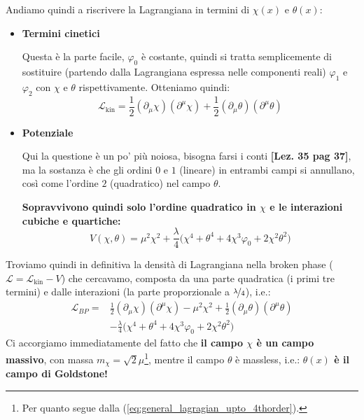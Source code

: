 \documentclass[../main.tex]{subfiles}
\begin{document}
Andiamo quindi a riscrivere la Lagrangiana in termini di $\chi(x)$ e $\theta(x)$:
\begin{itemize}
    \item[\blacksquare] \textbf{Termini cinetici} 

    Questa è la parte facile, $\varphi_0$ è costante, quindi si tratta semplicemente di sostituire (partendo dalla Lagrangiana espressa nelle componenti reali) $\varphi_1$ e $\varphi_2$ con  $\chi$ e $\theta$ rispettivamente. Otteniamo quindi:
    \begin{equation}
        \mathscr{L}_\text{kin} = \frac{1}{2}(\partial_\mu\chi)(\partial^\mu\chi)+\frac{1}{2}(\partial_\mu\theta)(\partial^\mu\theta)
        \label{eq:kinetic_terms_U1_SSB}
    \end{equation}
    \item[\blacksquare] \textbf{Potenziale}

    Qui la questione è un po' più noiosa, bisogna farsi i conti \textbf{[Lez. 35 pag 37]}, ma la sostanza è che gli ordini $0$ e $1$ (lineare) in entrambi campi si annullano, così come l'ordine $2$ (quadratico) nel campo $\theta$. 

    \textbf{Sopravvivono quindi solo l'ordine quadratico in $\chi$ e le interazioni cubiche e quartiche:}
    \begin{equation}
        V(\chi, \theta) = \mu^2\chi^2 + \frac{\lambda}{4}\big(\chi^4 + \theta^4 + 4\chi^3\varphi_0 +2\chi^2\theta^2 \big)
        \label{eq:potential_terms_U1_SSB}
    \end{equation}
\end{itemize}
Troviamo quindi in definitiva la densità di Lagrangiana nella broken phase ($\mathscr{L} = \mathscr{L}_\text{kin} - V$) che cercavamo, composta da una parte quadratica (i primi tre termini) e dalle interazioni (la parte proporzionale a $\nicefrac{\lambda}{4}$), i.e.:
\begin{equation}
    \boxed{\begin{aligned}
        \mathscr{L}_{BP} =& \frac{1}{2}(\partial_\mu\chi)(\partial^\mu\chi) -\mu^2\chi^2 +\frac{1}{2}(\partial_\mu\theta)(\partial^\mu\theta) \\
        &-\frac{\lambda}{4}\big(\chi^4 + \theta^4 + 4\chi^3\varphi_0 +2\chi^2\theta^2 \big)
    \end{aligned}}
    \label{eq:brokenphase_lagrangian_U1_SSB}
\end{equation}
Ci accorgiamo immediatamente del fatto che \textbf{il campo $\chi$ è un campo massivo}, con massa $m_\chi = \sqrt{2}\mu$\footnote{Per quanto segue dalla (\ref{eq:general_lagragian_upto_4thorder}).}, mentre il campo $\theta$ è massless, i.e.: \textbf{$\theta(x)$ è il campo di Goldstone!}
\end{document}
